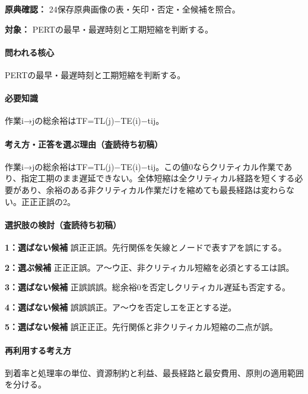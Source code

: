 \noindent\textbf{原典確認：} 24保存原典画像の表・矢印・否定・全候補を照合。\par

\noindent\textbf{対象：} PERTの最早・最遅時刻と工期短縮を判断する。\par

\paragraph{問われる核心} PERTの最早・最遅時刻と工期短縮を判断する。

\paragraph{必要知識} 作業i→jの総余裕はTF=\allowbreak{}TL(j)−TE(i)−tij。

\paragraph{考え方・正答を選ぶ理由（査読待ち初稿）} 作業i→jの総余裕はTF=\allowbreak{}TL(j)−TE(i)−tij。この値0ならクリティカル作業であり、指定工期のまま遅延できない。全体短縮は全クリティカル経路を短くする必要があり、余裕のある非クリティカル作業だけを縮めても最長経路は変わらない。正正正誤の2。

\paragraph{選択肢の検討（査読待ち初稿）}\mbox{}\par

\noindent\textbf{1：選ばない候補} 誤正正誤。先行関係を矢線とノードで表すアを誤にする。\par

\noindent\textbf{2：選ぶ候補} 正正正誤。ア〜ウ正、非クリティカル短縮を必須とするエは誤。\par

\noindent\textbf{3：選ばない候補} 正誤誤誤。総余裕0を否定しクリティカル遅延も否定する。\par

\noindent\textbf{4：選ばない候補} 誤誤誤正。ア〜ウを否定しエを正とする逆。\par

\noindent\textbf{5：選ばない候補} 誤正正正。先行関係と非クリティカル短縮の二点が誤。\par

\paragraph{再利用する考え方} 到着率と処理率の単位、資源制約と利益、最長経路と最安費用、原則の適用範囲を分ける。

